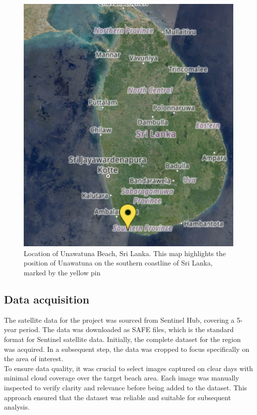 \documentclass[a4paper,12pt]{article}
\begin{document}
\begin{figure}[h!]
    \centering
    \includegraphics[width=0.35\linewidth]{Unawantuna_Copernicushub/Unawatuna_pin.png}
    \caption[Location of Unawatuna Beach, Sri Lanka]{Location of Unawatuna Beach, Sri Lanka. This map highlights the position of Unawatuna on the southern coastline of Sri Lanka, marked by the yellow pin}
    \label{fig:Unawatuna}
\end{figure}
\subsection{Data acquisition}
The satellite data for the project was sourced from Sentinel Hub, covering a 5-year period. The data was downloaded as SAFE files, which is the standard format for Sentinel satellite data. Initially, the complete dataset for the region was acquired. In a subsequent step, the data was cropped to focus specifically on the area of interest.\\
To ensure data quality, it was crucial to select images captured on clear days with minimal cloud coverage over the target beach area. Each image was manually inspected to verify clarity and relevance before being added to the dataset. This approach ensured that the dataset was reliable and suitable for subsequent analysis.
\end{document}
